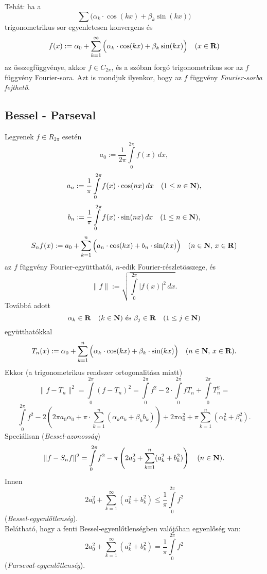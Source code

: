 Tehát: ha a
\[
	\sum\Big( \alpha_k \cdot \cos(kx) + \beta_k \sin(kx)\Big)
\]
trigonometrikus sor egyenletesen konvergens és
\[
	f(x) := \alpha_0 + 	\sum_{k=1}^\infty\Big( \alpha_k \cdot \cos(kx) + \beta_k \sin(kx)\Big) \quad (x \in \mathbf{R})
\]
az összegfüggvénye, akkor $f \in C_{2\pi}$, és a szóban forgó trigonometrikus sor az $f$ függvény Fourier-sora. Azt is mondjuk ilyenkor, hogy az $f$ függvény \textit{Fourier-sorba fejthető}.

\subsection{Bessel - Parseval}

Legyenek $f \in R_{2\pi}$ esetén
\[
	a_0 := \frac{1}{2\pi} \int\limits_0^{2\pi} f(x) \, dx,
\]
\[
	a_n := \frac{1}{\pi} \int\limits_0^{2\pi} f(x) \cdot \cos(nx) \, dx \quad (1 \leq n \in \mathbf{N}),
\]
\[
	b_n := \frac{1}{\pi} \int\limits_0^{2\pi} f(x) \cdot \sin(nx) \, dx \quad (1 \leq n \in \mathbf{N}),
\]
\[
	S_nf(x) := a_0 + \sum_{k=1}^n \Big(  a_n \cdot \cos(kx) + b_n \cdot \sin(kx)  \Big) \quad (n \in \mathbf{N}, \, x \in \mathbf{R})
\]
az $f$ függvény Fourier-együtthatói, $n$-edik Fourier-részletösszege, és
\[
	\| f\| := \sqrt{ \int\limits_0^{2\pi} |f(x)|^2 \, dx }.
\]
Továbbá adott
\[
	\alpha_k \in \mathbf{R} \quad (k \in \mathbf{N}) \text{ és } \beta_j \in \mathbf{R} \quad (1 \leq j \in \mathbf{N})
\]
együtthatókkal
\[
	T_n(x) := \alpha_0 + \sum_{k=1}^n \Big(  \alpha_k \cdot \cos(kx) + \beta_k \cdot \sin(kx)  \Big) \quad (n \in \mathbf{N}, \, x \in \mathbf{R}).
\]
Ekkor (a trigonometrikus rendszer ortogonalitása miatt)
\[
	\|f-T_n \|^2 = \int\limits_0^{2\pi} (f - T_n)^2 = \int\limits_0^{2\pi} f^2 - 2 \cdot \int\limits_0^{2\pi} f T_n + \int\limits_0^{2\pi} T^2_n =
\]
\[
	\int\limits_0^{2\pi} f^2 - 2\left( 2 \pi a_0 \alpha_0 + \pi \cdot \sum_{k=1}^n (\alpha_k a_k + \beta_k b_k) \right) + 2 \pi \alpha_0^2 + \pi \sum_{k=1}^n (\alpha_k^2 + \beta_k^2).
\]
Speciálisan (\textit{Bessel-azonosság})
\[
	\|f - S_nf\|^2 = \int\limits_0^{2\pi} f^2 - \pi \left( 2a_0^2 + \sum_{k=1}^n (a_k^2 + b_k^2) \right) \quad (n \in \mathbf{N}).
\]
Innen
\[
	2a_0^2 + \sum_{k=1}^\infty (a_k^2 + b_k^2) \leq \frac{1}{\pi} \int\limits_0^{2\pi} f^2
\]
(\textit{Bessel-egyenlőtlenség}). \\

Belátható, hogy a fenti Bessel-egyenlőtlenségben valójában egyenlőség van:
\[
	2a_0^2 + \sum_{k=1}^\infty (a_k^2 + b_k^2)  = \frac{1}{\pi} \int\limits_0^{2\pi} f^2
\]
(\textit{Parseval-egyenlőtlenség}).
